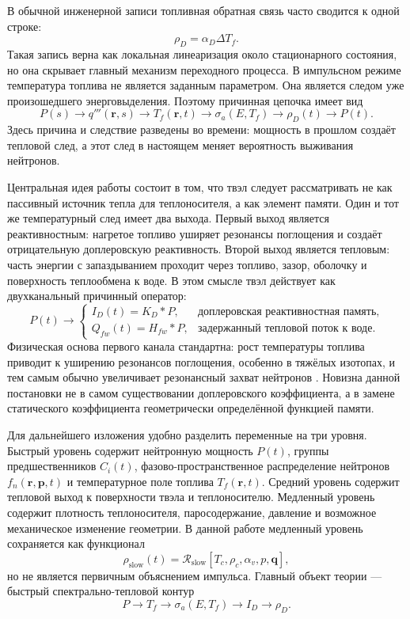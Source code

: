 \documentclass[12pt]{article}
\begin{document}
В обычной инженерной записи топливная обратная связь часто сводится к одной строке:
\[
\rho_D=\alpha_D\Delta T_f.
\]
Такая запись верна как локальная линеаризация около стационарного состояния, но она скрывает главный механизм переходного процесса. В импульсном режиме температура топлива не является заданным параметром. Она является следом уже произошедшего энерговыделения. Поэтому причинная цепочка имеет вид
\[
\boxed{
P(s)
\rightarrow
q'''(\mathbf r,s)
\rightarrow
T_f(\mathbf r,t)
\rightarrow
\sigma_a(E,T_f)
\rightarrow
\rho_D(t)
\rightarrow
P(t).
}
\]
Здесь причина и следствие разведены во времени: мощность в прошлом создаёт тепловой след, а этот след в настоящем меняет вероятность выживания нейтронов.

Центральная идея работы состоит в том, что твэл следует рассматривать не как пассивный источник тепла для теплоносителя, а как элемент памяти. Один и тот же температурный след имеет два выхода. Первый выход является реактивностным: нагретое топливо уширяет резонансы поглощения и создаёт отрицательную доплеровскую реактивность. Второй выход является тепловым: часть энергии с запаздыванием проходит через топливо, зазор, оболочку и поверхность теплообмена к воде. В этом смысле твэл действует как двухканальный причинный оператор:
\[
P(t)
\longrightarrow
\begin{cases}
I_D(t)=K_D*P, & \text{доплеровская реактивностная память},\\[3pt]
Q_{fw}(t)=H_{fw}*P, & \text{задержанный тепловой поток к воде}.
\end{cases}
\]
Физическая основа первого канала стандартна: рост температуры топлива приводит к уширению резонансов поглощения, особенно в тяжёлых изотопах, и тем самым обычно увеличивает резонансный захват нейтронов \cite{NRCFeedback2012,DOEGeneralTechnicalBase2013}. Новизна данной постановки не в самом существовании доплеровского коэффициента, а в замене статического коэффициента геометрически определённой функцией памяти.

Для дальнейшего изложения удобно разделить переменные на три уровня. Быстрый уровень содержит нейтронную мощность \(P(t)\), группы предшественников \(C_i(t)\), фазово-пространственное распределение нейтронов \(f_n(\mathbf r,\mathbf p,t)\) и температурное поле топлива \(T_f(\mathbf r,t)\). Средний уровень содержит тепловой выход к поверхности твэла и теплоносителю. Медленный уровень содержит плотность теплоносителя, паросодержание, давление и возможное механическое изменение геометрии. В данной работе медленный уровень сохраняется как функционал
\[
\rho_{\mathrm{slow}}(t)
=
\mathcal R_{\mathrm{slow}}
[T_c,\rho_c,\alpha_v,p,\mathbf q],
\]
но не является первичным объяснением импульса. Главный объект теории --- быстрый спектрально-тепловой контур
\[
P\rightarrow T_f\rightarrow \sigma_a(E,T_f)\rightarrow I_D\rightarrow \rho_D.
\]
\end{document}
